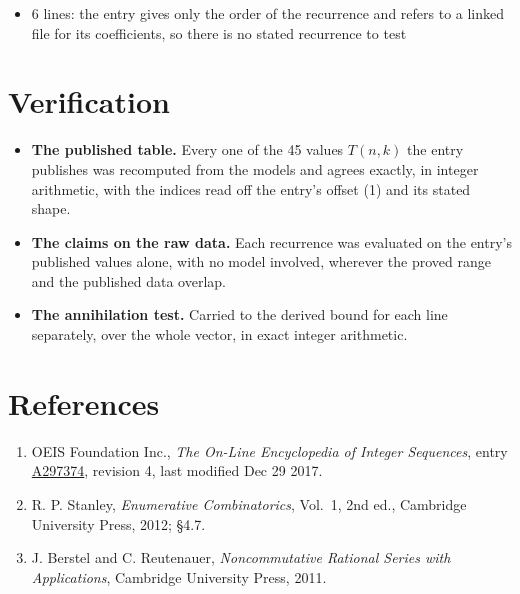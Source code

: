 \documentclass[11pt]{article}
\theoremstyle{definition}
\begin{document}
\begin{itemize}

\item 6 lines: the entry gives only the order of the recurrence and refers to a linked file for its coefficients, so there is no stated recurrence to test

\end{itemize}

\section{Verification}

\begin{itemize}

\item {\bfseries The published table.} Every one of the 45 values $T(n,k)$ the entry publishes was recomputed from the models and agrees exactly, in integer arithmetic, with the indices read off the entry's offset (1) and its stated shape.

\item {\bfseries The claims on the raw data.} Each recurrence was evaluated on the entry's published values alone, with no model involved, wherever the proved range and the published data overlap.

\item {\bfseries The annihilation test.} Carried to the derived bound for each line separately, over the whole vector, in exact integer arithmetic.

\end{itemize}

\section{References}

\begin{enumerate}

\item OEIS Foundation Inc., \emph{The On-Line Encyclopedia of Integer Sequences}, entry \href{https://oeis.org/A297374}{A297374}, revision 4, last modified Dec 29 2017.

\item R. P. Stanley, \emph{Enumerative Combinatorics}, Vol.~1, 2nd ed., Cambridge University Press, 2012; \S4.7.

\item J. Berstel and C. Reutenauer, \emph{Noncommutative Rational Series with Applications}, Cambridge University Press, 2011.

\end{enumerate}
\end{document}
